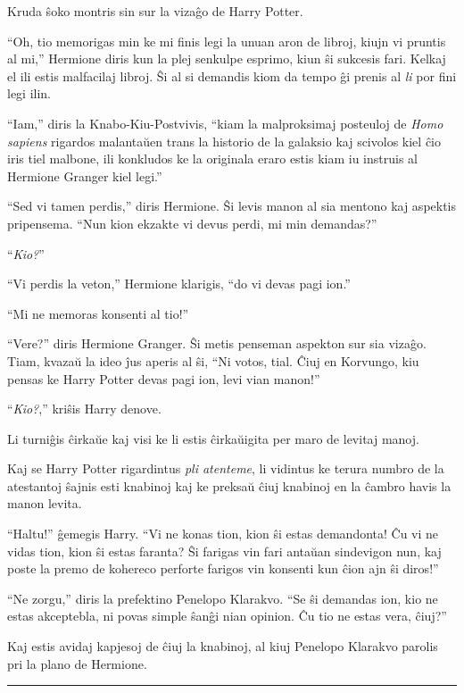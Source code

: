 Kruda ŝoko montris sin sur la vizaĝo de Harry Potter.

``Oh, tio memorigas min ke mi finis legi la unuan aron de libroj,
kiujn vi pruntis al mi,'' Hermione diris kun la plej senkulpe esprimo,
kiun ŝi sukcesis fari. Kelkaj el ili estis malfacilaj libroj. Ŝi al si
demandis kiom da tempo ĝi prenis al \emph{li} por fini legi ilin.

``Iam,'' diris la Knabo-Kiu-Postvivis, ``kiam la malproksimaj
posteuloj de \emph{Homo sapiens} rigardos malantaŭen trans la historio
de la galaksio kaj scivolos kiel ĉio iris tiel malbone, ili konkludos
ke la originala eraro estis kiam iu instruis al Hermione Granger kiel
legi.''

``Sed vi tamen perdis,'' diris Hermione. Ŝi levis manon al sia mentono
kaj aspektis pripensema. ``Nun kion ekzakte vi devus perdi, mi min
demandas?''


``\emph{Kio?}''

``Vi perdis la veton,'' Hermione klarigis, ``do vi devas pagi ion.''

``Mi ne memoras konsenti al tio!''

``Vere?'' diris Hermione Granger. Ŝi metis penseman aspekton sur sia
vizaĝo. Tiam, kvazaŭ la ideo ĵus aperis al ŝi, ``Ni votos, tial. Ĉiuj
en Korvungo, kiu pensas ke Harry Potter devas pagi ion, levi vian
manon!''

``\emph{Kio?},'' kriŝis Harry denove.

Li turniĝis ĉirkaŭe kaj visi ke li estis ĉirkaŭigita per maro de
levitaj manoj.

Kaj se Harry Potter rigardintus \emph{pli atenteme}, li vidintus ke
terura numbro de la atestantoj ŝajnis esti knabinoj kaj ke preksaŭ
ĉiuj knabinoj en la ĉambro havis la manon levita.

``Haltu!'' ĝemegis Harry. ``Vi ne konas tion, kion ŝi estas
demandonta! Ĉu vi ne vidas tion, kion ŝi estas faranta? Ŝi farigas vin
fari antaŭan sindevigon nun, kaj poste la premo de kohereco perforte
farigos vin konsenti kun ĉion ajn ŝi diros!''

``Ne zorgu,'' diris la prefektino Penelopo Klarakvo. ``Se ŝi demandas
ion, kio ne estas akceptebla, ni povas simple ŝanĝi nian opinion. Ĉu
tio ne estas vera, ĉiuj?''

Kaj estis avidaj kapjesoj de ĉiuj la knabinoj, al kiuj Penelopo
Klarakvo parolis pri la plano de Hermione.

\begin{center}\rule{3in}{0.4pt}\end{center}

